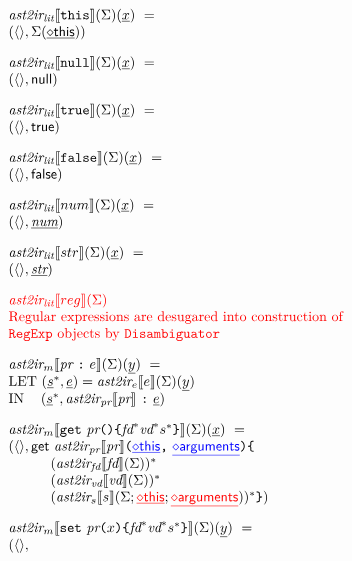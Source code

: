 \[\begin{array}{l@{~}l@{~}l}
\atoiLITfd {{\tt this}}(\ir{x})
\ =\\
(\emptyenv, \env(\newvar{this}))\\[1em]

\atoiLITfd{{\tt null}}(\ir{x})
\ =\\
(\emptyenv, {\sf null})\\[1em]

\atoiLITfd{{\tt true}}(\ir{x})
\ =\\
(\emptyenv, {\sf true})\\[1em]

\atoiLITfd{{\tt false}}(\ir{x})
\ =\\
(\emptyenv, {\sf false})\\[1em]

\atoiLITfd{num}(\ir{x})
\ =\\ 
(\emptyenv, \ir\num)\\[1em]

\atoiLITfd {str}(\ir{x})
\ =\\ 
(\emptyenv, \ir\str)\\[1em]

\inred\atoiLITfd { reg }\\
\mbox{\inred Regular expressions are desugared into construction of}\\
\mbox{\inred {\tt RegExp} objects by {\tt Disambiguator}}
\\[1em]

\atoiM\lbr {\prop \ \verb+:+ \ \expr}  \rbr(\env)(\ir{y})
\ =\\ \mbox{LET\ } (\irstmt^*, \irexpr) = \atoiEfd{\expr}(\ir{y})\\
 \mbox{IN}\hspace*{1.2em}
(\irstmt^*, \atoiPRfd{\prop} \ \verb+:+ \ \irexpr)
\\[1em]

\atoiM\lbr {\tt get} \ \prop \verb+(){+ \fd^* \vd^* \stmt^* \verb+}+  \rbr(\env)(\ir{x})
\ =\\ (
\langle\rangle,

{\sf get} \ \atoiPRfd{\prop} \verb+(+{\inblue\newvar{this}}\verb+,+\ {\inblue\newvar{arguments}}\verb+)+
\verb+{+\\
\quad\quad\quad(\atoiFDfd{\fd})^*\\
\quad\quad\quad(\atoiVDf{\vd}\env)^*\\
\quad\quad\quad(\atoiSf{\stmt}{\env; {\inred\newvar{this}}; {\inred\newvar{arguments}}})^*
\verb+}+
)
\\[1em]

\atoiM\lbr {\tt set} \ \prop \verb+(+x \verb+){+ \fd^* \vd^* \stmt^* \verb+}+  \rbr(\env)(\ir{y})
\ =\\ (
\langle\rangle,


\end{array}\]
